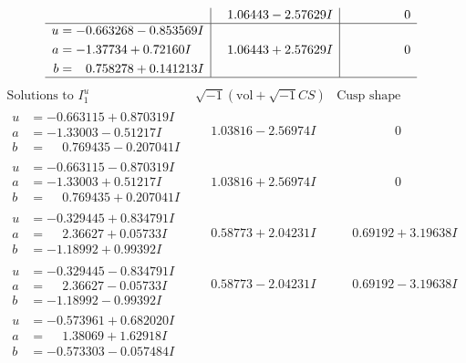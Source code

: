 \documentclass[1p]{elsarticle_modified}
\theoremstyle{definition}
\newcommand{\I}{\sqrt{-1}}
\begin{document}
$$\begin{array}{c|c|c}
 & \phantom{-}1.06443 - 2.57629 I & \phantom{-0.000000 } 0 \\ \hline\begin{aligned}
u &= -0.663268 - 0.853569 I \\
a &= -1.37734 + 0.72160 I \\
b &= \phantom{-}0.758278 + 0.141213 I\end{aligned}
 & \phantom{-}1.06443 + 2.57629 I & \phantom{-0.000000 } 0\\
 \hline 
 \end{array}$$\newpage$$\begin{array}{c|c|c}  
\text{Solutions to }I^u_{1}& \I (\text{vol} + \sqrt{-1}CS) & \text{Cusp shape}\\
 \hline 
\begin{aligned}
u &= -0.663115 + 0.870319 I \\
a &= -1.33003 - 0.51217 I \\
b &= \phantom{-}0.769435 - 0.207041 I\end{aligned}
 & \phantom{-}1.03816 - 2.56974 I & \phantom{-0.000000 } 0 \\ \hline\begin{aligned}
u &= -0.663115 - 0.870319 I \\
a &= -1.33003 + 0.51217 I \\
b &= \phantom{-}0.769435 + 0.207041 I\end{aligned}
 & \phantom{-}1.03816 + 2.56974 I & \phantom{-0.000000 } 0 \\ \hline\begin{aligned}
u &= -0.329445 + 0.834791 I \\
a &= \phantom{-}2.36627 + 0.05733 I \\
b &= -1.18992 + 0.99392 I\end{aligned}
 & \phantom{-}0.58773 + 2.04231 I & \phantom{-}0.69192 + 3.19638 I \\ \hline\begin{aligned}
u &= -0.329445 - 0.834791 I \\
a &= \phantom{-}2.36627 - 0.05733 I \\
b &= -1.18992 - 0.99392 I\end{aligned}
 & \phantom{-}0.58773 - 2.04231 I & \phantom{-}0.69192 - 3.19638 I \\ \hline\begin{aligned}
u &= -0.573961 + 0.682020 I \\
a &= \phantom{-}1.38069 + 1.62918 I \\
b &= -0.573303 - 0.057484 I\end{aligned}

\end{array}$$
\end{document}
